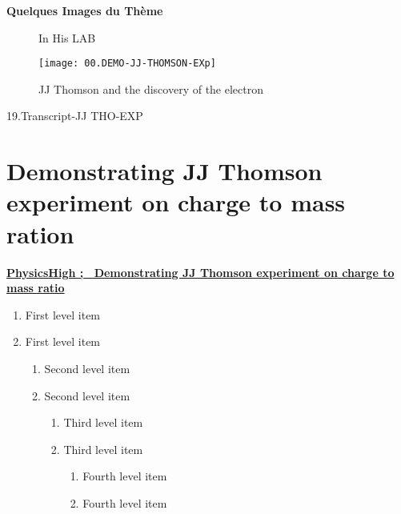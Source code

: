 \documentclass[../main.tex]{subfiles}
\begin{document}
\textbf{ Quelques Images du Thème}
    \begin{figure}[bh]
        \centering
                \caption{In His LAB}
        \texttt{[image: 00.DEMO-JJ-THOMSON-EXp]} 
         \caption{JJ Thomson and the discovery of the electron}
        \label{fig:img1}
            \end{figure}
    19.Transcript-JJ THO-EXP
    
    
\section{Demonstrating JJ Thomson experiment on charge to mass ration}
\href{https://www.youtube.com/watch?v=QuLtuM8bAMI}{\textbf{PhysicsHigh ; \  Demonstrating JJ Thomson experiment on charge to mass ratio}}\\
    
    \begin{enumerate}
   \item First level item
   \item First level item
   \begin{enumerate}
     \item Second level item
     \item Second level item
     \begin{enumerate}
       \item Third level item
       \item Third level item
       \begin{enumerate}
         \item Fourth level item
         \item Fourth level item
       \end{enumerate}
     \end{enumerate}
   \end{enumerate}
 \end{enumerate}
    
    
\end{document}

